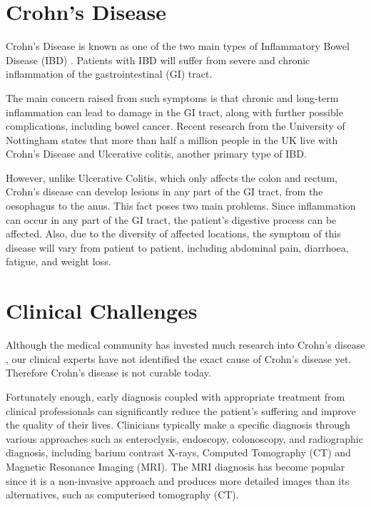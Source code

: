 \section{Crohn's Disease}

Crohn's Disease \cite{baumgart2012crohn,crohnsNHS} is known as one of the two main types of Inflammatory Bowel Disease (IBD) \cite{IBDCDC}. Patients with IBD will suffer from severe and chronic inflammation of the gastrointestinal (GI) tract. \medskip

\noindent The main concern raised from such symptoms is that chronic and long-term inflammation can lead to damage in the GI tract, along with further possible complications, including bowel cancer. Recent research from the University of Nottingham \cite{UoNResearch} states that more than half a million people in the UK live with Crohn's Disease and Ulcerative colitis, another primary type of IBD. \medskip

\noindent However, unlike Ulcerative Colitis, which only affects the colon and rectum, Crohn's disease can develop lesions in any part of the GI tract, from the oesophagus to the anus. This fact poses two main problems. Since inflammation can occur in any part of the GI tract, the patient's digestive process can be affected. Also, due to the diversity of affected locations, the symptom of this disease will vary from patient to patient, including abdominal pain, diarrhoea, fatigue, and weight loss. 
\section{Clinical Challenges}

\noindent Although the medical community has invested much research into Crohn's disease \cite{hoarau2016bacteriome,feuerstein2021aga}, our clinical experts have not identified the exact cause of Crohn's disease yet. Therefore Crohn's disease is not curable today. \medskip

\noindent Fortunately enough, early diagnosis coupled with appropriate treatment from clinical professionals can significantly reduce the patient's suffering and improve the quality of their lives. Clinicians typically make a specific diagnosis through various approaches such as enteroclysis, endoscopy, colonoscopy, and radiographic diagnosis, including barium contrast X-rays, Computed Tomography (CT) and Magnetic Resonance Imaging (MRI). The MRI diagnosis has become popular since it is a non-invasive approach and produces more detailed images than its alternatives, such as computerised tomography (CT). \medskip

